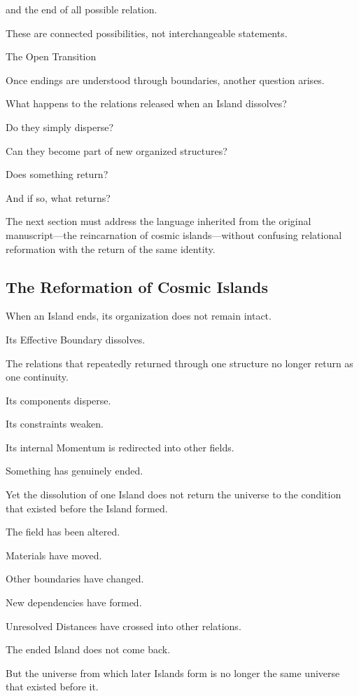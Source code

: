 and the end of all possible relation.

These are connected possibilities, not interchangeable statements.

The Open Transition

Once endings are understood through boundaries, another question arises.

What happens to the relations released when an Island dissolves?

Do they simply disperse?

Can they become part of new organized structures?

Does something return?

And if so, what returns?

The next section must address the language inherited from the original manuscript—the reincarnation of cosmic islands—without confusing relational reformation with the return of the same identity.

\subsection*{\textbf{ The Reformation of Cosmic Islands}} 

When an Island ends, its organization does not remain intact.

Its Effective Boundary dissolves.

The relations that repeatedly returned through one structure no longer return as one continuity.

Its components disperse.

Its constraints weaken.

Its internal Momentum is redirected into other fields.

Something has genuinely ended.

Yet the dissolution of one Island does not return the universe to the condition that existed before the Island formed.

The field has been altered.

Materials have moved.

Other boundaries have changed.

New dependencies have formed.

Unresolved Distances have crossed into other relations.

The ended Island does not come back.

But the universe from which later Islands form is no longer the same universe that existed before it.

